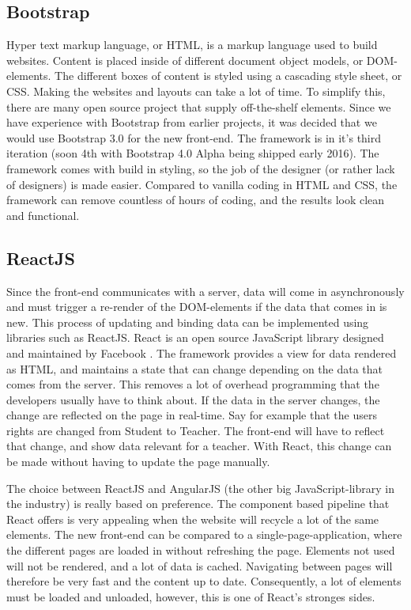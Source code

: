 \subsection{Bootstrap}
Hyper text markup language, or HTML, is a markup language used to build websites. Content is placed inside of different document object models, or DOM-elements. The different boxes of content is styled using a cascading style sheet, or CSS. Making the websites and layouts can take a lot of time. To simplify this, there are many open source project that supply off-the-shelf elements. Since we have experience with Bootstrap from earlier projects, it was decided that we would use Bootstrap 3.0 for the new front-end. The framework is in it's third iteration (soon 4th with Bootstrap 4.0 Alpha being shipped early 2016). The framework comes with build in styling, so the job of the designer (or rather lack of designers) is made easier. Compared to vanilla coding in HTML and CSS, the framework can remove countless of hours of coding, and the results look clean and functional.

\subsection{ReactJS}
Since the front-end communicates with a server, data will come in asynchronously and must trigger a re-render of the DOM-elements if the data that comes in is new. This process of updating and binding data can be implemented using libraries such as ReactJS. React is an open source JavaScript library designed and maintained by Facebook . The framework provides a view for data rendered as HTML, and maintains a state that can change depending on the data that comes from the server. This removes a lot of overhead programming that the developers usually have to think about. If the data in the server changes, the change are reflected on the page in real-time. Say for example that the users rights are changed from Student to Teacher. The front-end will have to reflect that change, and show data relevant for a teacher. With React, this change can be made without having to update the page manually. 


The choice between ReactJS and AngularJS (the other big JavaScript-library in the industry) is really based on preference. The component based pipeline that React offers is very appealing when the website will recycle a lot of the same elements. The new front-end can be compared to a single-page-application, where the different pages are loaded in without refreshing the page. Elements not used will not be rendered, and a lot of data is cached. Navigating between pages will therefore be very fast and the content up to date. Consequently, a lot of elements must be loaded and unloaded, however, this is one of React's stronges sides. 

